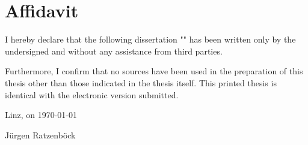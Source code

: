 \chapter*{Affidavit}

I hereby declare that the following dissertation "\thesistitle{}" has been written
only by the undersigned and without any assistance from third parties.

Furthermore, I confirm that no sources have been used in the preparation of this thesis other than those indicated in the thesis itself. This printed thesis is identical with the electronic version submitted.

Linz, on \today

\hfill J\"urgen Ratzenb\"ock
